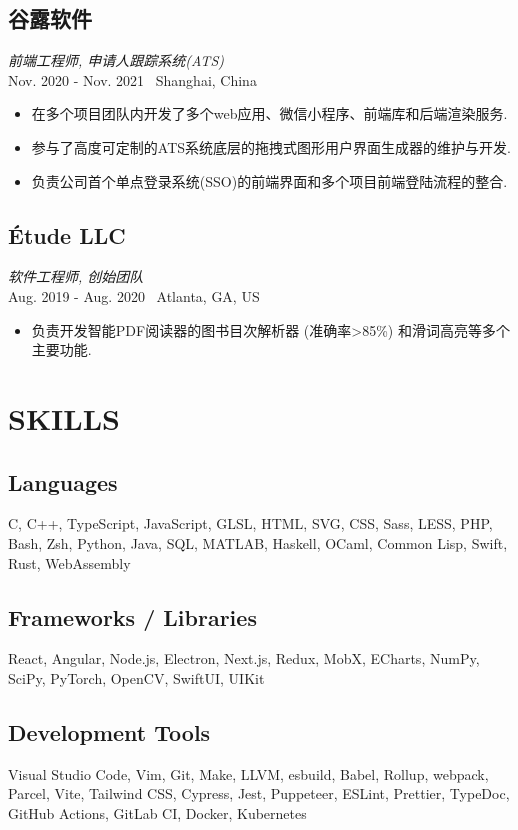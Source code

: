\documentclass[11pt,twocolumn]{article}
\begin{document}
\subsection*{谷露软件}
\textit{前端工程师, 申请人跟踪系统(ATS)}\\
Nov. 2020 - Nov. 2021 \textbullet\ Shanghai, China
\begin{itemize}
\item 在多个项目团队内开发了多个web应用、微信小程序、前端库和后端渲染服务.
\item 参与了高度可定制的ATS系统底层的拖拽式图形用户界面生成器的维护与开发.
\item 负责公司首个单点登录系统(SSO)的前端界面和多个项目前端登陆流程的整合.
\end{itemize}

\subsection*{Étude LLC}
\textit{软件工程师, 创始团队}\\
Aug. 2019 - Aug. 2020 \textbullet\ Atlanta, GA, US
\begin{itemize}
\item 负责开发智能PDF阅读器的图书目次解析器 (准确率>85\%) 和滑词高亮等多个主要功能.
\end{itemize}

\section*{\textnormal{SKILLS}}

\subsection*{Languages}
C, C++, TypeScript, JavaScript, GLSL, HTML, SVG, CSS, Sass, LESS, PHP, Bash, Zsh, Python, Java, SQL, MATLAB, Haskell, OCaml, Common Lisp, Swift, Rust, WebAssembly

\subsection*{Frameworks / Libraries}
React, Angular, Node.js, Electron, Next.js, Redux, MobX, ECharts, NumPy, SciPy, PyTorch, OpenCV, SwiftUI, UIKit

\subsection*{Development Tools}
Visual Studio Code, Vim, Git, Make, LLVM, esbuild, Babel, Rollup, webpack, Parcel, Vite, Tailwind CSS, Cypress, Jest, Puppeteer, ESLint, Prettier, TypeDoc, GitHub Actions, GitLab CI, Docker, Kubernetes
\end{document}
